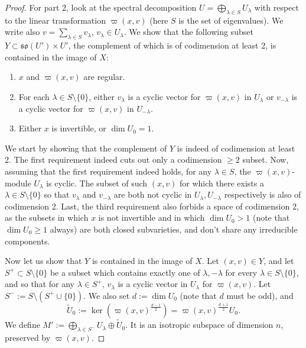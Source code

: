 \documentclass[11pt]{article}
\begin{document}
\begin{proof}
    For part 2, look at the spectral decomposition $U = \bigoplus_{\lambda\in S} U_\lambda$ with respect to the linear transformation $\varpi(x, v)$ (here $S$ is the set of eigenvalues). We write also $v = \sum_{\lambda\in S} v_\lambda$, $v_\lambda\in U_\lambda$. We show that the following subset $Y\subset\mathfrak{so}(U')\times U'$, the complement of which is of codimension at least 2, is contained in the image of $X$:
    \begin{enumerate}
        \item $x$ and $\varpi(x, v)$ are regular.
        \item For each $\lambda\in S\setminus \{0\}$, either $v_\lambda$ is a cyclic vector for $\varpi(x,v)$ in $U_\lambda$ or $v_{-\lambda}$ is a cyclic vector for $\varpi(x, v)$ in $U_{-\lambda}$.
        \item Either $x$ is invertible, or $\dim U_0=1$.
    \end{enumerate}

    We start by showing that the complement of $Y$ is indeed of codimension at least 2.
    The first requirement indeed cuts out only a codimension $\geq 2$ subset.
    Now, assuming that the first requirement indeed holds, for any $\lambda\in S$, the $\varpi(x, v)$-module $U_\lambda$ is cyclic.
    The subset of such $(x,v)$ for which there exists a $\lambda\in S\setminus\{0\}$ so that $v_\lambda$ and $v_{-\lambda}$ are both not cyclic in $U_\lambda, U_{-\lambda}$ respectively is also of codimension 2. Last, the third requirement also forbids a space of codimension 2, as the subsets in which $x$ is not invertible and in which $\dim U_0 > 1$ (note that $\dim U_0\geq 1$ always) are both closed subvarieties, and don't share any irreducible components.
    
    Now let us show that $Y$ is contained in the image of $X$.
    Let $(x,v)\in Y$, and let $S^+\subset S\setminus\{0\}$ be a subset which contains exactly one of $\lambda, -\lambda$ for every $\lambda\in S\setminus \{0\}$, and so that for any $\lambda\in S^+$, $v_\lambda$ is a cyclic vector in $U_\lambda$ for $\varpi(x, v)$. Let $S^- := S\setminus (S^+\cup \{0\})$.
    We also set $d := \dim U_0$ (note that $d$ must be odd), and $$\tilde{U}_0 := \ker(\varpi(x,v)^{\frac{d-1}{2}}) = \varpi(x, v)^{\frac{d+1}{2}}U_0.$$
    We define $M' := \bigoplus_{\lambda\in S^-} U_\lambda \oplus \tilde{U}_0$. It is an isotropic subspace of dimension $n$, preserved by $\varpi(x, v)$. 
    

\end{proof}
\end{document}
